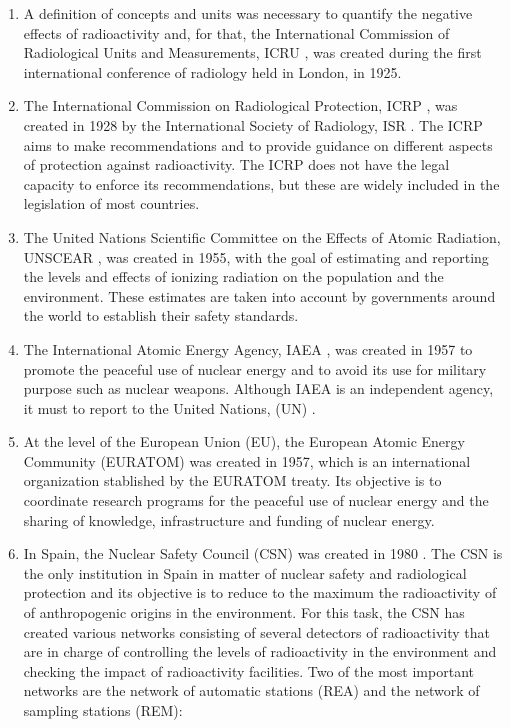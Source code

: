 \begin{enumerate}
\item{} A definition of concepts and units was necessary to quantify the negative effects of radioactivity and, for that, the International Commission of Radiological Units and Measurements, ICRU \cite{ICRU}, was created during the first international conference of radiology held in London, in 1925.

\item{} The International Commission on Radiological Protection, ICRP \cite{ICRP}, was created in 1928 by the International Society of Radiology, ISR \cite{ISR}. The ICRP aims to make recommendations and to provide guidance on different aspects of protection against radioactivity. The ICRP does not have the legal capacity to enforce its recommendations, but these are widely included in the legislation of most countries. %

\item{} The United Nations Scientific Committee on the Effects of Atomic Radiation, UNSCEAR \cite{UNSCEAR}, was created in 1955, with the goal of estimating and reporting the levels and effects of ionizing radiation on the population and the environment. These estimates are taken into account by governments around the world to establish their safety standards.

\item{} The International Atomic Energy Agency, IAEA \cite{IAEA}, was created in 1957 to promote the peaceful use of nuclear energy and to avoid its use for military purpose such as nuclear weapons. Although IAEA is an independent agency, it must to report to the United Nations, (UN) \cite{UN}.

\item{} At the level of the European Union (EU), the European Atomic Energy Community (EURATOM) was created in 1957, which is an international organization stablished by the EURATOM treaty. Its objective is to coordinate research programs for the peaceful use of nuclear energy and the sharing of knowledge, infrastructure and funding of nuclear energy.

\item{} In Spain, the Nuclear Safety Council (CSN) was created in 1980 \cite{CSN}. The CSN is the only institution in Spain in matter of nuclear safety and radiological protection and its objective is to reduce to the maximum the radioactivity of of anthropogenic origins in the environment. For this task, the CSN has created various networks consisting of several detectors of radioactivity that are in charge of controlling the levels of radioactivity in the environment and checking the impact of radioactivity facilities. Two of the most important networks are the network of automatic stations (REA) and the network of sampling stations (REM):


\end{enumerate}
